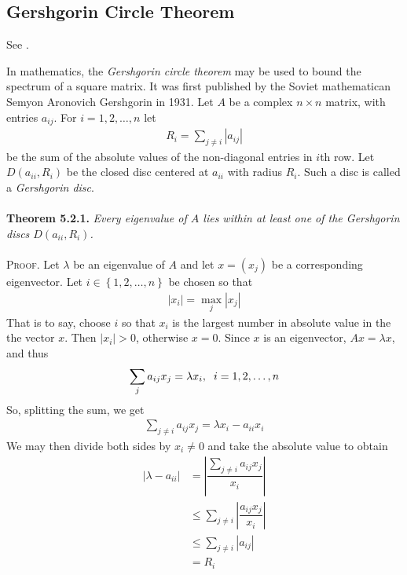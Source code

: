 \documentclass[a4paper,oneside]{book}
\numberwithin{equation}{chapter}
\begin{document}
\subsection{Gershgorin Circle Theorem}
See \cite{2}.

In mathematics, the \textit{Gershgorin circle theorem} may be used to bound the spectrum  of a square matrix. It was first published by the Soviet mathematican Semyon Aronovich Gershgorin in 1931.
Let $A$ be a complex $n\times n$ matrix, with entries $a_{ij}$. For $i=1,2,\ldots,n$ let 
\begin{align}
{R_i} = \sum\limits_{j \ne i} {\left| {{a_{ij}}} \right|} 
\end{align}
be the sum of the absolute values of the non-diagonal entries in $i$th row. Let $D\left(a_{ii},R_i\right)$ be the closed disc centered at $a_{ii}$ with radius $R_i$. Such a disc is called a \textit{Gershgorin disc}.\\
\\
\textbf{Theorem 5.2.1.} \textit{Every eigenvalue of $A$ lies within at least one of the Gershgorin discs $D\left(a_{ii},R_i\right)$.}\\
\\
\textsc{Proof.} Let $\lambda$ be an eigenvalue of $A$ and let $x=\left(x_j\right)$ be a corresponding eigenvector. Let $i \in \left\{ {1,2, \ldots ,n} \right\}$ be chosen so that 
\begin{align}
\left| {{x_i}} \right| = {\max _j}\left| {{x_j}} \right|
\end{align}
That is to say, choose $i$ so that $x_i$ is the largest number in absolute value in the the vector $x$. Then $\left| {{x_i}} \right|>0$, otherwise $x=0$.
Since $x$ is an eigenvector, $Ax=\lambda x$, and thus
\begin{align}
\sum\limits_j {{a_{ij}}{x_j}}  = \lambda {x_i},\hspace{0.2cm} i = 1,2, \ldots ,n
\end{align}
So, splitting the sum, we get
\begin{align}
\sum\limits_{j \ne i} {{a_{ij}}{x_j}}  = \lambda {x_i} - {a_{ii}}{x_i}
\end{align}
We may then divide both sides by $x_i \ne 0$ and take the absolute value to obtain
\begin{align}
\left| {\lambda  - {a_{ii}}} \right| &= \left| {\dfrac{{\sum\limits_{j \ne i} {{a_{ij}}{x_j}} }}{{{x_i}}}} \right|\\
 &\le \sum\limits_{j \ne i} {\left| {\dfrac{{{a_{ij}}{x_j}}}{{{x_i}}}} \right|} \\
& \le \sum\limits_{j \ne i} {\left| {{a_{ij}}} \right|} \\
& = {R_i}
\end{align}
\end{document}
